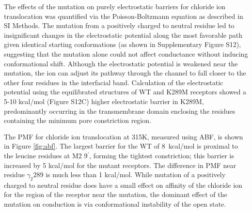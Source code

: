 \documentclass[journal=jacsat,manuscript=article]{achemso}
\newcommand{\fivering}{interfacial band~}
\newcommand{\fiveringnos}{interfacial band}
\newcommand{\extended}{elongated~}
\newcommand{\WT}{WT\xspace}
\newcommand{\MT}{K289M\xspace}
\begin{document}
The effects of the mutation on purely electrostatic barriers for chloride ion translocation was quantified via the Poisson-Boltzmann equation as described in SI Methods.  The mutation from a positively charged to neutral residue led to insignificant changes in the electrostatic potential along the most favorable path given identical starting conformations (as shown in Supplementary Figure S12), suggesting that the mutation alone could not affect conductance without inducing conformational shift. Although the electrostatic potential is weakened near the mutation, the ion can adjust its pathway through the channel to fall closer to the other four residues in the \fiveringnos. 
Calculation of the electrostatic potential using the equilibrated structures of \WT and \MT receptors showed a 5-10 kcal/mol (Figure S12C) higher electrostatic barrier in \MT , predominantly occurring in the transmembrane domain enclosing the residues containing the minimum pore constriction region. 

The PMF for chloride ion translocation at 315K, measured using ABF, is shown in Figure \ref{fig:abf}. The largest barrier for the \WT of 8~kcal/mol is proximal to the leucine residues at M2 9$^{\prime}$, forming the tightest constriction; this barrier is increased by 5 kcal/mol for the mutant receptors. 
The difference in PMF near residue $\gamma_{2} 289$ is much less than 1 kcal/mol. %
While mutation of a positively charged to neutral residue does have a small effect on affinity of the chloride ion for the region of the receptor near the mutation, 
the dominant effect of the mutation on conduction is via conformational instability of the open state.  %
\end{document}
